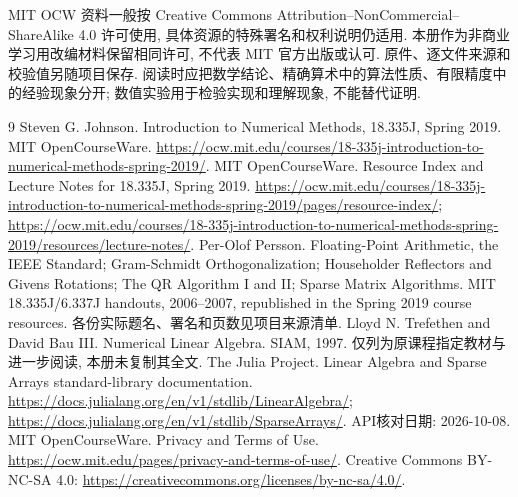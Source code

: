 MIT OCW 资料一般按 Creative Commons Attribution--NonCommercial--ShareAlike 4.0 许可使用, 具体资源的特殊署名和权利说明仍适用. 本册作为非商业学习用改编材料保留相同许可, 不代表 MIT 官方出版或认可. 原件、逐文件来源和校验值另随项目保存. 阅读时应把数学结论、精确算术中的算法性质、有限精度中的经验现象分开; 数值实验用于检验实现和理解现象, 不能替代证明.

\originalcontents
\clearpage
\mainmatter

























\begin{thebibliography}{9}
 Steven G. Johnson. Introduction to Numerical Methods, 18.335J, Spring 2019. MIT OpenCourseWare. \url{https://ocw.mit.edu/courses/18-335j-introduction-to-numerical-methods-spring-2019/}.
 MIT OpenCourseWare. Resource Index and Lecture Notes for 18.335J, Spring 2019. \url{https://ocw.mit.edu/courses/18-335j-introduction-to-numerical-methods-spring-2019/pages/resource-index/}; \url{https://ocw.mit.edu/courses/18-335j-introduction-to-numerical-methods-spring-2019/resources/lecture-notes/}.
 Per-Olof Persson. Floating-Point Arithmetic, the IEEE Standard; Gram-Schmidt Orthogonalization; Householder Reflectors and Givens Rotations; The QR Algorithm I and II; Sparse Matrix Algorithms. MIT 18.335J/6.337J handouts, 2006--2007, republished in the Spring 2019 course resources. 各份实际题名、署名和页数见项目来源清单.
 Lloyd N. Trefethen and David Bau III. Numerical Linear Algebra. SIAM, 1997. 仅列为原课程指定教材与进一步阅读, 本册未复制其全文.
 The Julia Project. Linear Algebra and Sparse Arrays standard-library documentation. \url{https://docs.julialang.org/en/v1/stdlib/LinearAlgebra/}; \url{https://docs.julialang.org/en/v1/stdlib/SparseArrays/}. API核对日期: 2026-10-08.
 MIT OpenCourseWare. Privacy and Terms of Use. \url{https://ocw.mit.edu/pages/privacy-and-terms-of-use/}. Creative Commons BY-NC-SA 4.0: \url{https://creativecommons.org/licenses/by-nc-sa/4.0/}.
\end{thebibliography}

